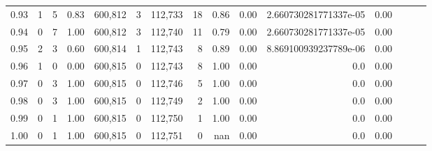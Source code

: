 \begin{tabular}{rrrrrrrrrrrrrrr}
0.93 &       1 &      5 &  0.83 &  600,812 &        3 &  112,733 &       18 &  0.86 &  0.00 &   2.660730281771337e-05 &      0.00 \\
0.94 &       0 &      7 &  1.00 &  600,812 &        3 &  112,740 &       11 &  0.79 &  0.00 &   2.660730281771337e-05 &      0.00 \\
0.95 &       2 &      3 &  0.60 &  600,814 &        1 &  112,743 &        8 &  0.89 &  0.00 &   8.869100939237789e-06 &      0.00 \\
0.96 &       1 &      0 &  0.00 &  600,815 &        0 &  112,743 &        8 &  1.00 &  0.00 &                     0.0 &      0.00 \\
0.97 &       0 &      3 &  1.00 &  600,815 &        0 &  112,746 &        5 &  1.00 &  0.00 &                     0.0 &      0.00 \\
0.98 &       0 &      3 &  1.00 &  600,815 &        0 &  112,749 &        2 &  1.00 &  0.00 &                     0.0 &      0.00 \\
0.99 &       0 &      1 &  1.00 &  600,815 &        0 &  112,750 &        1 &  1.00 &  0.00 &                     0.0 &      0.00 \\
1.00 &       0 &      1 &  1.00 &  600,815 &        0 &  112,751 &        0 &   nan &  0.00 &                     0.0 &      0.00 \\
\bottomrule
\end{tabular}
